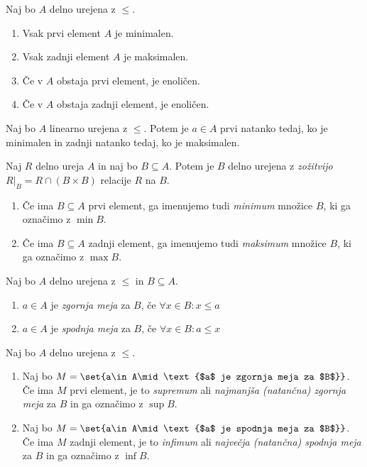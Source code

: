 \documentclass[12pt, a4paper]{article}
\begin{document}
\begin{trditev}
Naj bo $A$ delno urejena z $\leq$.

\begin{enumerate}
\item Vsak prvi element $A$ je minimalen.
\item Vsak zadnji element $A$ je maksimalen.
\item Če v $A$ obstaja prvi element, je enoličen.
\item Če v $A$ obstaja zadnji element, je enoličen.
\end{enumerate}
\end{trditev}

\obvs

\begin{trditev}
Naj bo $A$ linearno urejena z $\leq$. Potem je $a\in A$ prvi natanko tedaj, ko je minimalen in zadnji natanko tedaj, ko je maksimalen.
\end{trditev}

\obvs

\begin{opomba}
Naj $R$ delno ureja $A$ in naj bo $B\subseteq A$. Potem je $B$ delno urejena z \emph{zožitvijo} $R|_B=R\cap(B\times B)$ relacije $R$ na $B$.

\begin{enumerate}
\item Če ima $B\subseteq A$ prvi element, ga imenujemo tudi \emph{minimum} množice $B$, ki ga označimo z $\min B$.
\item Če ima $B\subseteq A$ zadnji element, ga imenujemo tudi \emph{maksimum} množice $B$, ki ga označimo z $\max B$.
\end{enumerate}
\end{opomba}

\begin{definicija}
Naj bo $A$ delno urejena z $\leq$ in $B\subseteq A$.

\begin{enumerate}
\item $a\in A$ je \emph{zgornja meja} za $B$, če $\forall x\in B\colon x\leq a$
\item $a\in A$ je \emph{spodnja meja} za $B$, če $\forall x\in B\colon a\leq x$
\end{enumerate}
\end{definicija}

\begin{definicija}
Naj bo $A$ delno urejena z $\leq$.

\begin{enumerate}
\item Naj bo $M=\set{a\in A\mid\text{$a$ je zgornja meja za $B$}}$. Če ima $M$ prvi element, je to \emph{supremum} ali \emph{najmanjša (natančna) zgornja meja} za $B$ in ga označimo z $\sup B$.
\item Naj bo $M=\set{a\in A\mid\text{$a$ je spodnja meja za $B$}}$. Če ima $M$ zadnji element, je to \emph{infimum} ali \emph{največja (natančna) spodnja meja} za $B$ in ga označimo z $\inf B$.
\end{enumerate}
\end{definicija}
\end{document}

